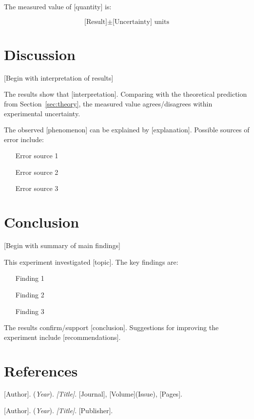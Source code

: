 \documentclass[12pt,a4paper]{article}
\begin{document}
The measured value of [quantity] is:

$$
\text{[Result]} \pm \text{[Uncertainty]} \text{ units}
$$

\section{Discussion}
\label{sec:discussion}

[Begin with interpretation of results]

The results show that [interpretation]. Comparing with the theoretical prediction from Section~\ref{sec:theory}, the measured value agrees/disagrees within experimental uncertainty.

The observed [phenomenon] can be explained by [explanation]. Possible sources of error include:
\begin{itemize}
    \item [Error source 1]
    \item [Error source 2]
    \item [Error source 3]
\end{itemize}

\section{Conclusion}
\label{sec:conclusion}

[Begin with summary of main findings]

This experiment investigated [topic]. The key findings are:
\begin{enumerate}
    \item [Finding 1]
    \item [Finding 2]
    \item [Finding 3]
\end{enumerate}

The results confirm/support [conclusion]. Suggestions for improving the experiment include [recommendations].

\section{References}
\label{sec:references}

\begin{thebibliography}{9}

[Author]. (\textit{Year}). \textit{[Title]}. [Journal], [Volume](Issue), [Pages].

[Author]. (\textit{Year}). \textit{[Title]}. [Publisher].

\end{thebibliography}
\end{document}

